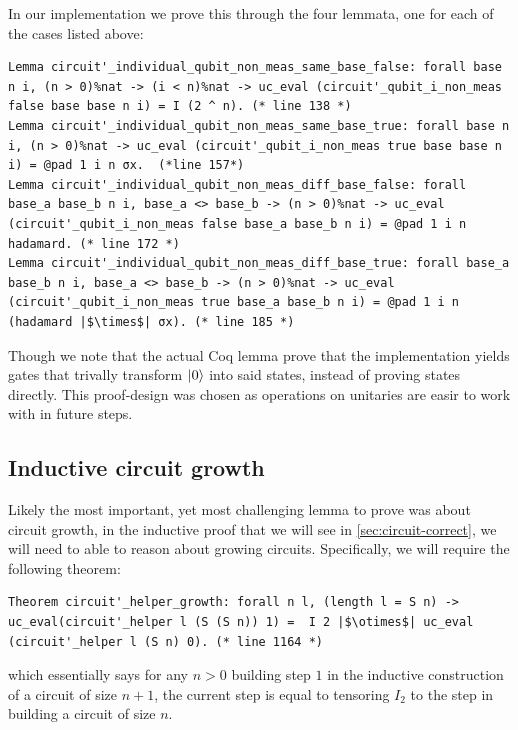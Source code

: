 \documentclass{article}
\begin{document}
In our implementation we prove this through the four lemmata, one for each of the cases listed above:
\begin{verbatim}
Lemma circuit'_individual_qubit_non_meas_same_base_false: forall base n i, (n > 0)%nat -> (i < n)%nat -> uc_eval (circuit'_qubit_i_non_meas false base base n i) = I (2 ^ n). (* line 138 *)
Lemma circuit'_individual_qubit_non_meas_same_base_true: forall base n i, (n > 0)%nat -> uc_eval (circuit'_qubit_i_non_meas true base base n i) = @pad 1 i n σx.  (*line 157*)
Lemma circuit'_individual_qubit_non_meas_diff_base_false: forall base_a base_b n i, base_a <> base_b -> (n > 0)%nat -> uc_eval (circuit'_qubit_i_non_meas false base_a base_b n i) = @pad 1 i n hadamard. (* line 172 *)
Lemma circuit'_individual_qubit_non_meas_diff_base_true: forall base_a base_b n i, base_a <> base_b -> (n > 0)%nat -> uc_eval (circuit'_qubit_i_non_meas true base_a base_b n i) = @pad 1 i n (hadamard |$\times$| σx). (* line 185 *)

\end{verbatim}
Though we note that the actual Coq lemma prove that the implementation yields gates that trivally transform $\ket{0}$ into said states, instead of proving states directly. 
This proof-design was chosen as operations on unitaries are easir to work with in future steps.

\subsection{Inductive circuit growth}\label{sec:circuit-growth}

Likely the most important, yet most challenging lemma to prove was about circuit growth, in the inductive proof that we will see in \cref{sec:circuit-correct}, we will need to able to reason about growing circuits.
Specifically, we will require the following theorem:
\begin{verbatim}
Theorem circuit'_helper_growth: forall n l, (length l = S n) ->  uc_eval(circuit'_helper l (S (S n)) 1) =  I 2 |$\otimes$| uc_eval (circuit'_helper l (S n) 0). (* line 1164 *)
\end{verbatim}
which essentially says for any $n>0$ building step $1$ in the inductive construction of a circuit of size $n+1$, the current step is equal to tensoring $I_2$ to the  step in building a circuit of size $n$.
\end{document}
